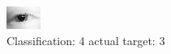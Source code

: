\begin{figure}[h!]
\begin{center}
\includegraphics[width=0.60\columnwidth]{figures/ID111_class_4_target_3.png}
\end{center}
\caption{ Classification: 4 actual target: 3}
\label{fig:ID111_class_4_target_3}
\end{figure}
